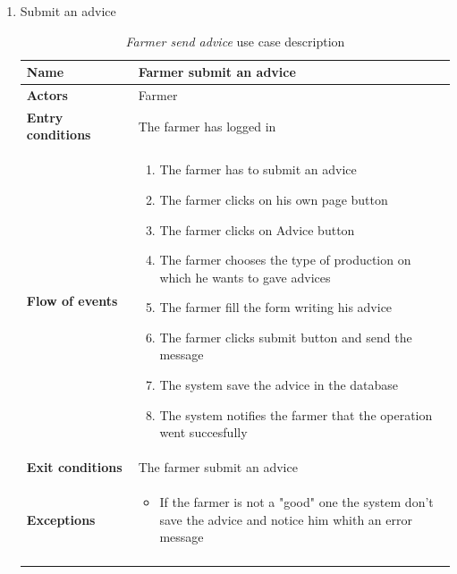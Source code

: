 \begin{enumerate}
    \item Submit an advice
    \begin{longtable}{p{0.26\linewidth}p{0.75\linewidth}}
        \toprule
        \textbf{Name} & \textbf{Farmer submit an advice} \\
        \midrule
        \textbf{Actors} & Farmer \\
        \midrule
        \textbf{Entry conditions} & The farmer has logged in\\
        \midrule
        \textbf{Flow of events} & 
        \begin{enumerate}
            \item The farmer has to submit an advice 
            \item The farmer clicks on his own page button
            \item The farmer clicks on Advice button
            \item The farmer chooses the type of production on which he wants to gave advices
            \item The farmer fill the form writing his advice
            \item The farmer clicks submit button and send the message
            \item The system save the advice in the database
            \item The system notifies the farmer that the operation went succesfully 
        \end{enumerate} \\
        \midrule
        \textbf{Exit conditions} & The farmer submit an advice\\
        \midrule
        \textbf{Exceptions} & 
        \begin{itemize}
            \item If the farmer is not a "good" one the system don't save the advice and notice him whith an error message
        \end{itemize}\\
        \bottomrule
        \caption{\emph{Farmer send advice} use case description}
    \end{longtable}
    \begin{figure}[H]
        \begin{center}

\end{center}
\end{figure}
\end{enumerate}
